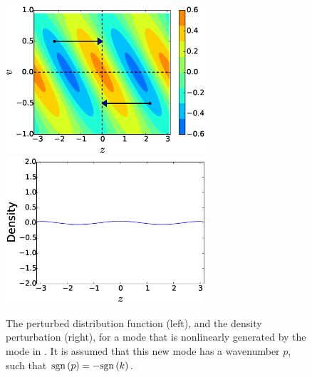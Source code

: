      \begin{figure}
     \begin{center}
        \includegraphics[width=7.4cm]{figs/intro/phmix_echot4.eps}
        \includegraphics[width=7.4cm]{figs/intro/denstecho4.eps}
        \caption{The perturbed distribution function (left), and the density perturbation
        (right), for a mode that is nonlinearly generated by the mode in
        . It is assumed that this new mode has a wavenumber
        $p$, such that ${\rm sgn}\,(p) = -{\rm sgn}\,(k)$.} 
        \label{intro:fig:echo:t0}
     \end{center}
     \end{figure}

